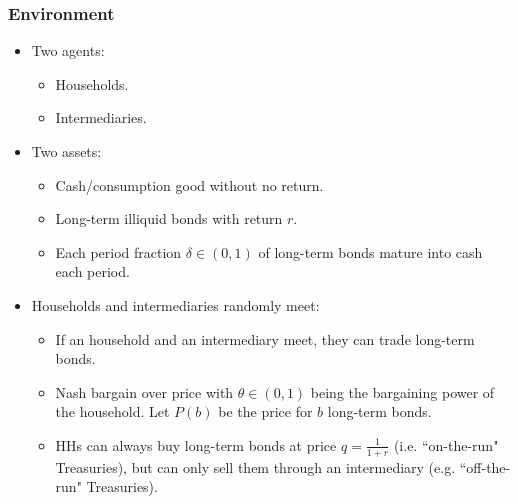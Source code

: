 \documentclass[handout]{beamer}
\begin{document}
\begin{frame}
\frametitle{Environment}

\begin{itemize}[<+->]

\item Two agents: 
\begin{itemize}[<+->]

\item Households.
\item Intermediaries.

\end{itemize}

\bigskip

\item Two assets:

\begin{itemize}[<+->]

\item Cash/consumption good without no return.
\item Long-term illiquid bonds with return $r$. 
\item Each period fraction $\delta \in (0, 1)$ of long-term bonds mature into cash each period. 

\end{itemize}

\bigskip

\item Households and intermediaries randomly meet:

\begin{itemize}[<+->]

\item If an household and an intermediary meet, they can trade long-term bonds.
\item Nash bargain over price with $\theta \in (0, 1)$ being the bargaining power of the household. Let $P(b)$ be the price for $b$ long-term bonds.
\item HHs can always buy long-term bonds at price $q = \frac{1}{1+r}$ (i.e. ``on-the-run" Treasuries), but can only sell them through an intermediary (e.g. ``off-the-run" Treasuries).

\end{itemize}

\end{itemize}

\end{frame}
\end{document}
